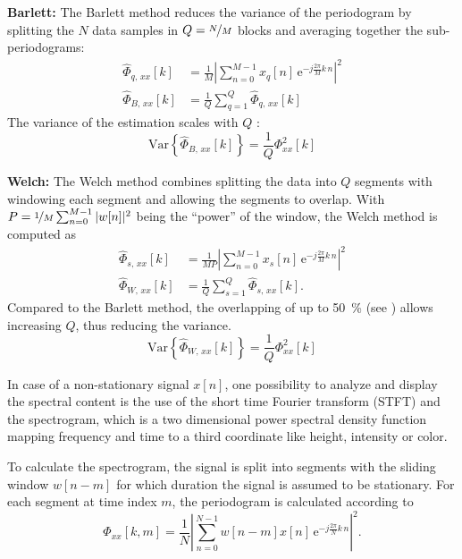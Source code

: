 \textbf{Barlett:} The Barlett method reduces the variance of the periodogram by splitting the $N$ data samples in $Q=\nicefrac{N}{M}$ blocks and averaging together the sub-periodograms:
\begin{align}
\hat{\Phi}_{q,\,xx}[k] &= \frac{1}{M} \left| \sum_{n=0}^{M-1} x_q[n]\,\text{e}^{-j\frac{2\pi}{M}k\,n}\right|^2\\
\hat{\Phi}_{B,\,xx}[k] &= \frac{1}{Q} \sum_{q=1}^{Q} \hat{\Phi}_{q,\,xx}[k]
\end{align}
The variance of the estimation scales with $Q$ \cite[p.~6]{Rowell2008}:
\begin{equation}
\text{Var}\left\{\hat{\Phi}_{B,\,xx}[k]\right\} = \frac{1}{Q}\Phi_{xx}^2[k]
\end{equation}

\textbf{Welch:} The Welch method combines splitting the data into $Q$ segments with windowing each segment and allowing the segments to overlap. With $P = \nicefrac{1}{M} \sum_{n=0}^{M-1} |w[n]|^2$ being the ``power'' of the window, the Welch method is computed as
\begin{align}
\hat{\Phi}_{s,\,xx}[k] &= \frac{1}{M P} \left| \sum_{n=0}^{M-1} x_s[n]\,\text{e}^{-j\frac{2\pi}{M}k\,n}\right|^2\\
\hat{\Phi}_{W,\,xx}[k] &= \frac{1}{Q} \sum_{s=1}^{Q} \hat{\Phi}_{s,\,xx}[k].
\end{align}
Compared to the Barlett method, the overlapping of up to \SI{50}{\percent} (see \cite{Welch1967}) allows increasing $Q$, thus reducing the variance.
\begin{equation}\label{eq:varWelch}
\text{Var}\left\{\hat{\Phi}_{W,\,xx}[k]\right\} = \frac{1}{Q}\Phi_{xx}^2[k]
\end{equation}


In case of a non-stationary signal $x[n]$, one possibility to analyze and display the spectral content is the use of the short time Fourier transform (STFT) and the spectrogram, which is a two dimensional power spectral density function mapping frequency and time to a third coordinate like height, intensity or color.

To calculate the spectrogram, the signal is split into segments with the sliding window $w[n-m]$ for which duration the signal is assumed to be stationary. For each segment at time index $m$, the periodogram is calculated according to
\begin{equation}
\hat{\Phi}_{xx}[k,m] = \frac{1}{N} \left| \sum_{n=0}^{N-1} w[n-m] x[n]\,\text{e}^{-j\frac{2\pi}{N}k\,n}\right|^2.
\end{equation}









